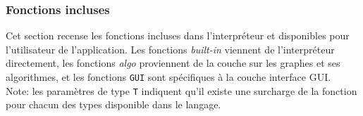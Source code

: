 \documentclass[french]{article}
\begin{document}
			\subsubsection{Fonctions incluses}
			\label{subsec:annexes-fonctions-incluses}
			Cet section recense les fonctions incluses dans l'interpréteur et disponibles pour l'utilisateur de l'application. Les fonctions \textit{built-in} viennent de l'interpréteur directement, les fonctions \textit{algo} proviennent de la couche sur les graphes et ses algorithmes, et les fonctions \texttt{GUI} sont spécifiques à la couche interface GUI.\\
			
			Note: les paramètres de type \texttt{T} indiquent qu'il existe une surcharge de la fonction pour chacun des types disponible dans le langage.
			
\end{document}
